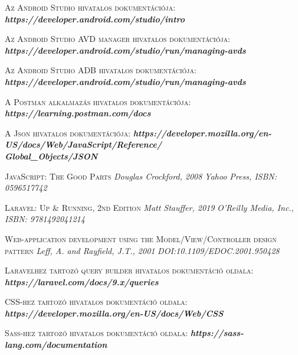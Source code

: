 \documentclass[
]{thesis-ekf}
\theoremstyle{definition}
\theoremstyle{remark}
\begin{document}
\begin{thebibliography}{2}
		\textsc{Az Android Studio hivatalos dokumentációja:}
		\newline
		\emph{\bf{https://developer.android.com/studio/intro}}
		
		\textsc{Az Android Studio AVD manager hivatalos dokumentációja:}
		\newline
		\emph{\bf{https://developer.android.com/studio/run/managing-avds}}
		
		\textsc{Az Android Studio ADB hivatalos dokumentációja:}
		\newline
		\emph{\bf{https://developer.android.com/studio/run/managing-avds}}
		
		\textsc{A Postman alkalmazás hivatalos dokumentációja:}
		\newline
		\emph{\bf{https://learning.postman.com/docs}}
		
		\textsc{A Json hivatalos dokumentációja:}
		\newline
		\emph{\bf{https://developer.mozilla.org/en-US/docs/Web/JavaScript/Reference/\\Global\_Objects/JSON}}
		
		\textsc{JavaScript: The Good Parts}
		\newline
		\emph{Douglas Crockford, 2008}
		\emph{Yahoo Press, ISBN: 0596517742}
		
		\textsc{Laravel: Up \& Running, 2nd Edition}
		\newline
		\emph{Matt Stauffer, 2019}
		\emph{O'Reilly Media, Inc., ISBN: 9781492041214}
		
		\textsc{Web-application development using the Model/View/Controller design pattern}
		\newline
		\emph{Leff, A. and Rayfield, J.T., 2001}
		\emph{DOI:10.1109/EDOC.2001.950428}
		
		\textsc{Laravelhez tartozó query builder hivatalos dokumentáció oldala:}
		\newline
		\emph{\bf{https://laravel.com/docs/9.x/queries}}
		
		\textsc{CSS-hez tartozó hivatalos dokumentáció oldala:}
		\newline
		\emph{\bf{https://developer.mozilla.org/en-US/docs/Web/CSS}}
		
		\textsc{Sass-hez tartozó hivatalos dokumentáció oldala:}
		\newline
		\emph{\bf{https://sass-lang.com/documentation}}
		

\end{thebibliography}
\end{document}
